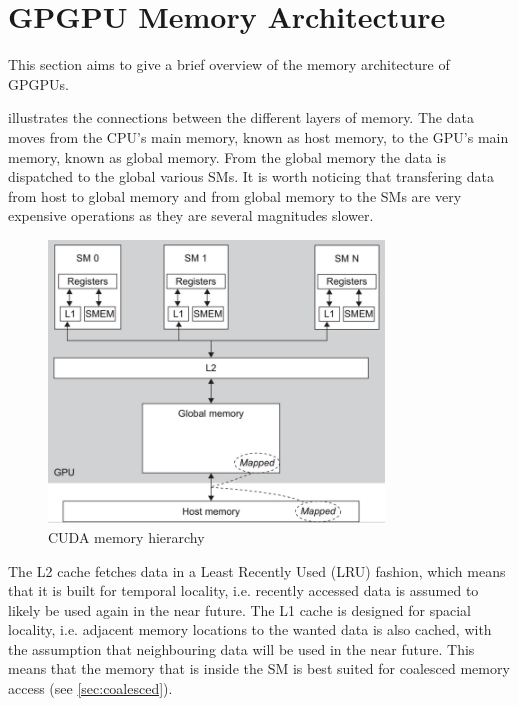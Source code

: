 \section{GPGPU Memory Architecture}
\label{sec:gpgpu memory architecture}

This section aims to give a brief overview of the memory architecture of GPGPUs.

 illustrates the connections between the different layers of memory.
The data moves from the CPU's main memory, known as host memory, to the GPU's main memory, known as global memory.
From the global memory the data is dispatched to the global various SMs.
It is worth noticing that transfering data from host to global memory and from global memory to the SMs are very expensive operations as they are several magnitudes slower.

\begin{figure}[htb]
  \centering
  \includegraphics[height=7.5cm]{graphics/images/cuda-mem-hierarchy.png}
  \caption{CUDA memory hierarchy~\cite{farber2011cuda}}
  \label{fig:cpu gpu communication}
\end{figure}

The L2 cache fetches data in a Least Recently Used (LRU) fashion, which means that it is built for temporal locality, i.e. recently accessed data is assumed to likely be used again in the near future.
The L1 cache is designed for spacial locality, i.e. adjacent memory locations to the wanted data is also cached, with the assumption that neighbouring data will be used in the near future.
This means that the memory that is inside the SM is best suited for coalesced memory access (see \cref{sec:coalesced}).


